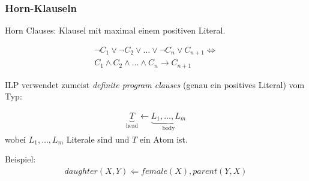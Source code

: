 \begin{frame}
	\frametitle{Horn-Klauseln}
	Horn Clauses: Klausel mit maximal einem positiven Literal.

	\begin{align*}
		\neg C_1 \lor \neg C_2 \lor \ldots \lor \neg C_n  \lor C_{n+1} \Leftrightarrow\\
		C_1 \land C_2 \land \ldots \land C_n  \rightarrow C_{n+1}
	\end{align*}

	ILP verwendet zumeist \textit{definite program clauses } (genau ein positives Literal) vom Typ:

	\begin{align*}
		\underbrace{T}_{\text{head}} \leftarrow \underbrace{L_1, \ldots, L_m}_{\text{body}}
	\end{align*}
	wobei $L_1, \ldots, L_m$ Literale sind und $T$ ein Atom ist.

	Beispiel:
	\begin{align*}
		daughter(X,Y) \Leftarrow female(X), parent(Y, X)
	\end{align*}
\end{frame}

